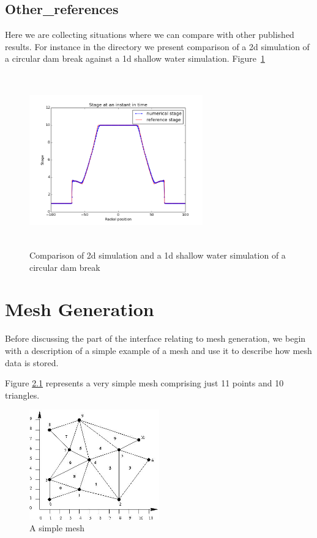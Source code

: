 \documentclass{manual}
\begin{document}
\section{Other\_references}

Here we are collecting situations where we can compare with other published results. For instance in the directory we present comparison of a 2d \anuga simulation of a circular dam break against a 1d shallow water simulation. Figure~\ref{fig:circular:dam} 


\begin{figure}[htp]
  \centerline{\includegraphics[width=75mm, height=75mm]
    {graphics/circular-dam-wet-stage-plot.png}}
  \caption{Comparison of \anuga 2d simulation and a 1d shallow water simulation of a circular dam break}
  \label{fig:circular:dam}
\end{figure}



\chapter{Mesh Generation}
\label{sec:establishing the mesh}
Before discussing the part of the interface relating to mesh
generation, we begin with a description of a simple example of a
mesh and use it to describe how mesh data is stored.

\label{sec:meshexample} Figure \ref{fig:simplemesh} represents a
very simple mesh comprising just 11 points and 10 triangles.

\begin{figure}[htp]
  \begin{center}
    \includegraphics[width=0.5\textwidth]{graphics/triangularmesh.jpg}
  \end{center}
  \caption{A simple mesh}
  \label{fig:simplemesh}
\end{figure}
\end{document}
